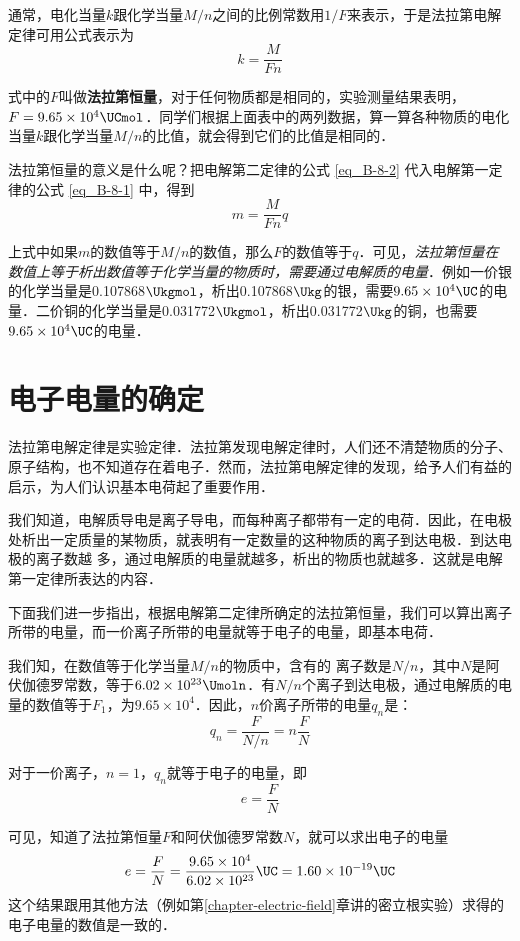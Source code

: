 通常，电化当量$k$跟化学当量$M/n$之间的比例常数用$1/F$来表示，于是法拉第电解定律可用公式表示为
\begin{equation} \label{eq_B-8-2}
    k=\frac{M}{Fn}
\end{equation}

式中的$F$叫做\textbf{法拉第恒量}，对于任何物质都是相同的，实验测量结果表明，$F=9.65\times10^4\UCmol$．同学们根据上面表中的两列数据，算一算各种物质的电化当量$k$跟化学当量$M/n$的比值，就会得到它们的比值是相同的．

法拉第恒量的意义是什么呢？把电解第二定律的公式 \eqref{eq_B-8-2} 代入电解第一定律的公式 \eqref{eq_B-8-1} 中，得到
\begin{equation}\label{eq_B-8-3}
    m=\frac{M}{Fn}q
\end{equation}

上式中如果$m$的数值等于$M/n$的数值，那么$F$的数值等于$q$．可见，\textit{法拉第恒量在数值上等于析出数值等于化学当量的物质时，需要通过电解质的电量}．例如一价银的化学当量是0.107868$\Ukgmol$，析出0.107868$\Ukg$的银，需要$9.65\times10^4 \UC $的电量．二价铜的化学当量是0.031772$\Ukgmol$，析出0.031772$\Ukg$的铜，也需要$9.65\times10^4 \UC$的电量．

\section{电子电量的确定}
法拉第电解定律是实验定律．法拉第发现电解定律时，人们还不清楚物质的分子、原子结构，也不知道存在着电子．然而，法拉第电解定律的发现，给予人们有益的启示，为人们认识基本电荷起了重要作用．

我们知道，电解质导电是离子导电，而每种离子都带有一定的电荷．因此，在电极处析出一定质量的某物质，就表明有一定数量的这种物质的离子到达电极．到达电极的离子数越
多，通过电解质的电量就越多，析出的物质也就越多．这就是电解第一定律所表达的内容．

下面我们进一步指出，根据电解第二定律所确定的法拉第恒量，我们可以算出离子所带的电量，而一价离子所带的电量就等于电子的电量，即基本电荷．

我们知，在数值等于化学当量$M/n$的物质中，含有的
离子数是$N/n$，其中$N$是阿伏伽德罗常数，等于$6.02\times10^{23} \Umoln $．有$N/n$个离子到达电极，通过电解质的电量的数值等于$F_1$，为$9.65\times10^4$．因此，$n$价离子所带的电量$q_n$是：
\[q_n=\frac{F}{N/n}=n\frac{F}{N} \]

对于一价离子，$n=1$，$q_n$就等于电子的电量，即
\[e=\frac{F}{N}\]

可见，知道了法拉第恒量$F$和阿伏伽德罗常数$N$，就可以求出电子的电量 
\[e=\frac{F}{N}=\frac{9.65\times10^4}{6.02\times10^{23}}\UC =1.60\times 10^{-19}\UC \]
这个结果跟用其他方法（例如第\ref{chapter-electric-field}章讲的密立根实验）求得的电子电量的数值是一致的．

